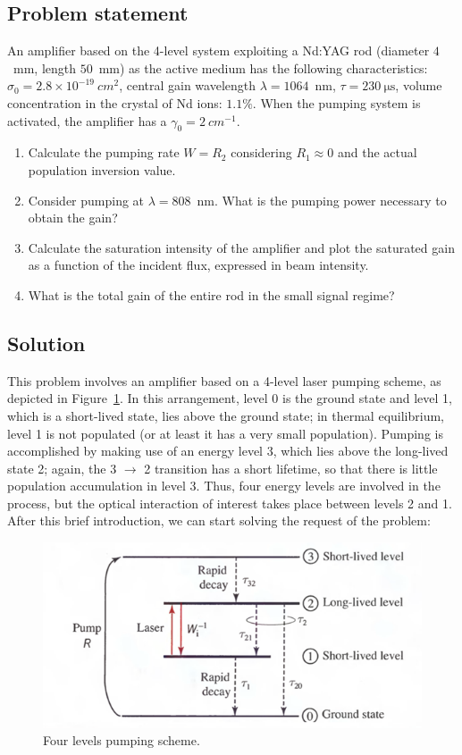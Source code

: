 \documentclass[prl, 11 pt]{revtex4-2}
\begin{document}
\subsection{Problem statement}
An amplifier based on the 4-level system exploiting a Nd:YAG rod (diameter $4$~mm, length $50$~mm) as the active medium has the following characteristics:
$\sigma_0 = 2.8 \times 10^{-19}~\si{cm^{2}}$, central gain wavelength $\lambda = 1064$~nm, $\tau = 230~\si{\micro\second}$, volume concentration in the crystal of Nd ions: $1.1\%$. When the pumping system is activated, the amplifier has a $\gamma_0 = 2~\si{cm^{-1}}$.
\begin{enumerate}
    \item Calculate the pumping rate $W = R_2$ considering $R_1 \approx 0$ and the actual population inversion value.
    \item Consider pumping at $\lambda = 808$~nm. What is the pumping power necessary to obtain the gain?
    \item Calculate the saturation intensity of the amplifier and plot the saturated gain as a function of the incident flux, expressed in beam intensity.
    \item What is the total gain of the entire rod in the small signal regime?
\end{enumerate}

\subsection{Solution}

This problem involves an amplifier based on a 4-level laser pumping scheme, as depicted in Figure~\ref{fig:four_level_scheme}. In this arrangement, level 0 is the ground state and level 1, which is a short-lived state, lies above the ground state; in thermal equilibrium, level 1 is not populated (or at least it has a very small population). Pumping is accomplished by making use of an energy level 3, which lies above the long-lived state 2; again, the 3 $\rightarrow$ 2 transition has a short lifetime, so that there is little population accumulation in level 3. Thus, four energy levels are involved in the process, but the optical interaction of interest takes place between levels 2 and 1. After this brief introduction, we can start solving the request of the problem:

%
\begin{figure}[!b]
    \centering
    \includegraphics[width=0.5\linewidth]{Images/four_level_scheme.png}
    \caption{Four levels pumping scheme.}
    \label{fig:four_level_scheme}
\end{figure}
%
\end{document}
